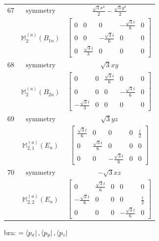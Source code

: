 \documentclass[fleqn,8pt,landscape]{jsarticle}
\begin{document}
\begin{longtable}{ccc}
$ 67 $ & $ \text{symmetry} $ & $ \frac{\sqrt{3} x^{2}}{2} - \frac{\sqrt{3} y^{2}}{2} $ \\
$  $ & $ \mathbb{M}_{2}^{(a)}(B_{1u}) $ & $ \begin{bmatrix} 0 & 0 & 0 & - \frac{\sqrt{3} i}{6} & 0 \\ 0 & 0 & - \frac{\sqrt{3} i}{6} & 0 & 0 \\ 0 & \frac{\sqrt{3} i}{3} & 0 & 0 & 0 \end{bmatrix} $ \\ \hline
$ 68 $ & $ \text{symmetry} $ & $ \sqrt{3} x y $ \\
$  $ & $ \mathbb{M}_{2}^{(a)}(B_{2u}) $ & $ \begin{bmatrix} 0 & 0 & \frac{\sqrt{3} i}{6} & 0 & 0 \\ 0 & 0 & 0 & - \frac{\sqrt{3} i}{6} & 0 \\ - \frac{\sqrt{3} i}{3} & 0 & 0 & 0 & 0 \end{bmatrix} $ \\ \hline
$ 69 $ & $ \text{symmetry} $ & $ \sqrt{3} y z $ \\
$  $ & $ \mathbb{M}_{2,1}^{(a)}(E_{u}) $ & $ \begin{bmatrix} \frac{\sqrt{3} i}{6} & 0 & 0 & 0 & \frac{i}{2} \\ 0 & \frac{\sqrt{3} i}{6} & 0 & 0 & 0 \\ 0 & 0 & - \frac{\sqrt{3} i}{6} & 0 & 0 \end{bmatrix} $ \\ \hline
$ 70 $ & $ \text{symmetry} $ & $ - \sqrt{3} x z $ \\
$  $ & $ \mathbb{M}_{2,2}^{(a)}(E_{u}) $ & $ \begin{bmatrix} 0 & \frac{\sqrt{3} i}{6} & 0 & 0 & 0 \\ - \frac{\sqrt{3} i}{6} & 0 & 0 & 0 & \frac{i}{2} \\ 0 & 0 & 0 & - \frac{\sqrt{3} i}{6} & 0 \end{bmatrix} $ \\ \hline
\end{longtable}
bra: $=\bra{p_{x}}, \bra{p_{y}}, \bra{p_{z}}$
\end{document}
